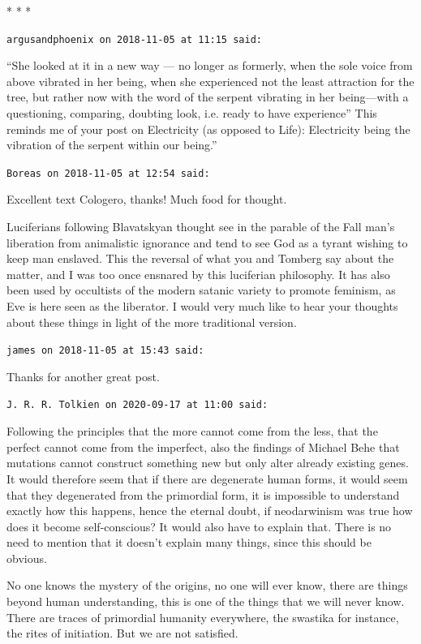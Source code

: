 
\begin{center}* * *\end{center}

\begin{footnotesize}\begin{sffamily}

\texttt{argusandphoenix on 2018-11-05 at 11:15 said: }

“She looked at it in a new way — no longer as formerly, when the sole voice from above vibrated in her
being, when she experienced not the least attraction for the tree, but rather now with the word of the serpent
vibrating in her being—with a questioning, comparing, doubting look, i.e. ready to have experience” This
reminds me of your post on Electricity (as opposed to Life): Electricity being the vibration of the serpent within our
being.''


\hfill

\texttt{Boreas on 2018-11-05 at 12:54 said: }

Excellent text Cologero, thanks! Much food for thought.

Luciferians following Blavatskyan thought see in the parable of the Fall man's liberation from animalistic
ignorance and tend to see God as a tyrant wishing to keep man enslaved. This the reversal of what you and Tomberg say
about the matter, and I was too once ensnared by this luciferian philosophy. It has also been used by occultists of the
modern satanic variety to promote feminism, as Eve is here seen as the liberator. I would very much like to hear your
thoughts about these things in light of the more traditional version.


\hfill

\texttt{james on 2018-11-05 at 15:43 said: }

Thanks for another great post.


\hfill

\texttt{J. R. R. Tolkien on 2020-09-17 at 11:00 said: }

Following the principles that the more cannot come from the less, that the perfect cannot come from the imperfect, also
the findings of Michael Behe that mutations cannot construct something new but only alter already existing genes. It
would therefore seem that if there are degenerate human forms, it would seem that they degenerated from the primordial
form, it is impossible to understand exactly how this happens, hence the eternal doubt, if neodarwinism was true how
does it become self-conscious? It would also have to explain that. There is no need to mention that it
doesn't explain many things, since this should be obvious.

No one knows the mystery of the origins, no one will ever know, there are things beyond human understanding, this is one
of the things that we will never know. There are traces of primordial humanity everywhere, the swastika for instance,
the rites of initiation. But we are not satisfied.

\hfill
\end{sffamily}\end{footnotesize}
